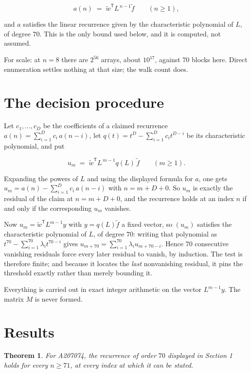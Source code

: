 \documentclass[11pt]{article}
\newtheorem{theorem}{Theorem}
\theoremstyle{definition}
\begin{document}
\[a(n) \;=\; \tilde w^{\mathsf T} L^{\,n-1} \tilde f \qquad (n \ge 1),\]

and $a$ satisfies the linear recurrence given by the characteristic polynomial of $L$, of degree $70$. This is the only bound used below, and it is computed, not assumed.

For scale: at $n = 8$ there are $2^{56}$ arrays, about $10^{17}$, against $70$ blocks here. Direct enumeration settles nothing at that size; the walk count does.

\section{The decision procedure}

Let $c_1,\dots,c_D$ be the coefficients of a claimed recurrence $a(n) = \sum_{i=1}^{D} c_i\,a(n-i)$, let $q(t) = t^{D} - \sum_{i=1}^{D} c_i t^{D-i}$ be its characteristic polynomial, and put

\[u_m \;=\; \tilde w^{\mathsf T} L^{\,m-1} q(L)\,\tilde f \qquad (m \ge 1).\]

Expanding the powers of $L$ and using the displayed formula for $a$, one gets $u_m = a(n) - \sum_{i=1}^{D} c_i\,a(n-i)$ with $n = m + D + 0$. So $u_m$ is exactly the residual of the claim at $n = m + D + 0$, and the recurrence holds at an index $n$ if and only if the corresponding $u_m$ vanishes.

Now $u_m = \tilde w^{\mathsf T} L^{m-1} y$ with $y = q(L)\tilde f$ a fixed vector, so $(u_m)$ satisfies the characteristic polynomial of $L$, of degree $70$: writing that polynomial as $t^{70} - \sum_{i=1}^{70} \lambda_i t^{70-i}$ gives $u_{m+70} = \sum_{i=1}^{70} \lambda_i u_{m+70-i}$. Hence $70$ consecutive vanishing residuals force every later residual to vanish, by induction. The test is therefore finite; and because it locates the {\itshape last} nonvanishing residual, it pins the threshold exactly rather than merely bounding it.

Everything is carried out in exact integer arithmetic on the vector $L^{m-1}y$. The matrix $M$ is never formed.

\section{Results}

\begin{theorem} For A207074, the recurrence of order $70$ displayed in Section 1 holds for every $n \ge 71$, at every index at which it can be stated.\end{theorem}
\end{document}
